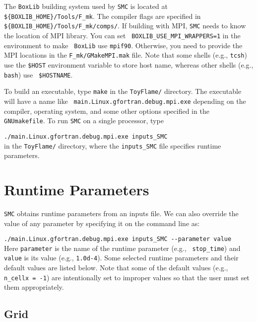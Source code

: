 \documentclass[11pt,letterpaper]{article}
\begin{document}
The {\tt BoxLib} building system used by {\tt SMC} is located at {\tt
  \$\{BOXLIB\_HOME\}/Tools/F\_mk}.  The compiler flags are specified
in {\tt \$\{BOXLIB\_HOME\}/Tools/F\_mk/comps/}.  If building with MPI,
{\tt SMC} needs to know the location of MPI library.  You can set {\tt
  BOXLIB\_USE\_MPI\_WRAPPERS=1} in the environment to make {\tt
  BoxLib} use {\tt mpif90}.  Otherwise, you need to provide the MPI
locations in the {\tt F\_mk/GMakeMPI.mak} file.  Note that some shells
(e.g., {\tt tcsh}) use the {\tt \$HOST} environment variable to store
host name, whereas other shells (e.g., {\tt bash}) use {\tt
  \$HOSTNAME}.

To build an executable, type {\tt make} in the {\tt ToyFlame/}
directory.  The executable will have a name like {\tt
  main.Linux.gfortran.debug.mpi.exe} depending on the compiler,
operating system, and some other options specified in the {\tt
  GNUmakefile}.  To run {\tt SMC} on a single processor, type
\vspace{5pt}

\verb|./main.Linux.gfortran.debug.mpi.exe inputs_SMC|\vspace{5pt}\\
in the {\tt ToyFlame/} directory, where the {\tt inputs\_SMC} file
specifies runtime parameters.

\section{Runtime Parameters}

{\tt SMC} obtains runtime parameters from an inputs file.  We can also
override the value of any parameter by specifying it on the
command line as:\vspace{5pt}

\verb|./main.Linux.gfortran.debug.mpi.exe inputs_SMC --parameter value|\\

Here {\tt parameter} is the name of the runtime parameter (e.g., {\tt
  stop\_time}) and {\tt value} is its value (e.g., {\tt 1.0d-4}).
Some selected runtime parameters and their default values are listed
below.  Note that some of the default values (e.g., {\tt n\_cellx =
  -1}) are intentionally set to improper values so that the user must
set them appropriately.

\subsection{Grid}
\end{document}
